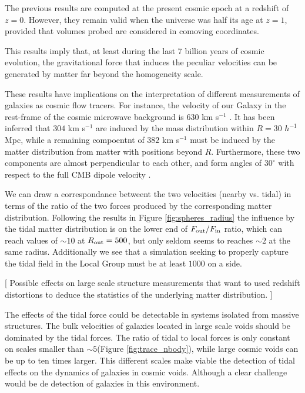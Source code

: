\documentclass{article}
\newcommand{\hMpc}{{\ifmmode{h^{-1}{\rm Mpc}}\else{$h^{-1}$Mpc }\fi}}
\begin{document}
The previous results are computed at the present cosmic epoch at a
redshift of $z=0$. However, they remain valid when the universe
was half its age at $z=1$, provided that volumes probed are considered
in comoving coordinates.

This results imply that, at least during the last 7 billion years of
cosmic evolution, the gravitational force that induces the peculiar
velocities can be generated by matter far beyond the homogeneity
scale. 

These results have implications on the interpretation of different
measurements of galaxies as cosmic flow tracers. For instance, the
velocity of our Galaxy in the rest-frame of the cosmic microwave
background is 630 km s$^{-1}$ \cite{Fixsen96}. It has been inferred
that $304$ km s$^{-1}$ are induced by the mass distribution within
$R=30$ $h^{-1}$ Mpc, while a remaining compoentnt of $382$ km s$^{-1}$  must
be induced by the matter distribution from matter with positions
beyond $R$. Furthermore, these two components are almost
perpendicular to each other, and form angles of $30^{\circ}$ with
respect to the full CMB dipole velocity \cite{Courtois12}. 

We can draw a correspondance betweent the two velocities (nearby
vs. tidal) in terms of the ratio of the two forces produced by the
corresponding matter distribution.  Following the results in Figure
\ref{fig:spheres_radius} the
influence by the tidal matter distribution is on the lower end of
$F_{\rm out}/F_{\rm in}$ ratio, which can reach values of $\sim 10$ at
$R_{\rm out}=500$\hMpc, but only seldom seems to reaches $\sim 2$ at
the same radius. Additionally we see that a simulation seeking to
properly capture the tidal field in the Local Group must be at least
$1000$ \hMpc on a side.  


[ Possible effects on large scale structure measurements that want
to used redshift distortions to deduce the statistics of the
underlying matter distribution. ]


The effects of the tidal force could be detectable in systems isolated
from massive structures. The bulk velocities of galaxies
located in large scale voids should be dominated by the tidal forces. The ratio of tidal to local
forces is only constant on scales smaller than $\sim 5$\hMpc (Figure
\ref{fig:trace_nbody}), while large cosmic voids can be up to ten
times larger. This different scales make viable the detection of tidal
effects on the dynamics of galaxies in cosmic voids. Although a clear
challenge would be de detection of galaxies in this environment.
\end{document}

